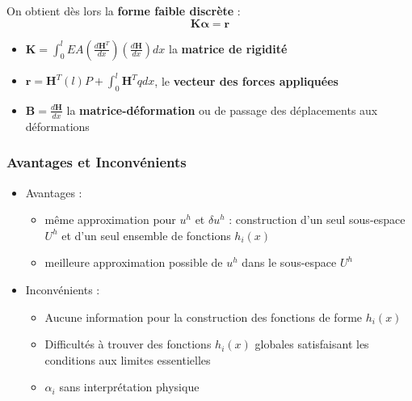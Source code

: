 \documentclass[../main.tex]{subfiles}
\begin{document}
On obtient dès lors la \textbf{forme faible discrète} : \begin{equation}
    \mathbf{K} \mathbf{\alpha} = \mathbf{r}
\end{equation}

\begin{itemize}
    \item $\mathbf{K} = \int_0^l EA (\frac{d \mathbf{H}^T}{dx})(\frac{d\mathbf{H}}{dx})dx$ la \textbf{matrice de rigidité}\\
    \item $\mathbf{r} = \mathbf{H}^T(l)P + \int_0^l \mathbf{H}^T qdx$, le \textbf{vecteur des forces appliquées}\\
    \item $\mathbf{B} = \frac{d\mathbf{H}}{dx}$ la \textbf{matrice-déformation} ou de passage des déplacements aux déformations\\
\end{itemize}

\subsubsection{Avantages et Inconvénients}
\begin{itemize}
    \item Avantages : \begin{itemize}
        \item même approximation pour $u^h$ et $\delta u^h$ : construction d'un seul sous-espace $U^h$ et d'un seul ensemble de fonctions $h_i(x)$\\
        \item meilleure approximation possible de $u^h$ dans le sous-espace $U^h$\\
    \end{itemize}
    \item Inconvénients : \begin{itemize}
        \item Aucune information pour la construction des fonctions de forme $h_i(x)$\\
        \item Difficultés à trouver des fonctions $h_i(x)$ globales satisfaisant les conditions aux limites essentielles\\
        \item $\alpha_i$ sans interprétation physique\\
    \end{itemize}
\end{itemize}
\end{document}
